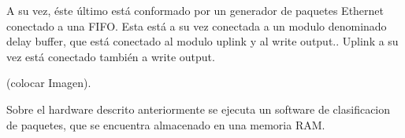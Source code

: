 A su vez, éste último está conformado por un generador de paquetes Ethernet conectado a una FIFO. Esta está a su vez conectada a un modulo denominado delay buffer, que está conectado al modulo uplink y al write output.. Uplink a su vez está conectado también a write output.

(colocar Imagen).

Sobre el hardware descrito anteriormente se ejecuta un software de clasificacion de paquetes, que se encuentra almacenado en una memoria RAM.



